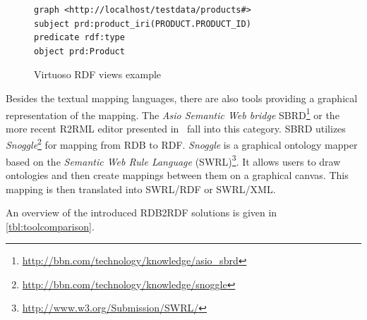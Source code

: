 \begin{figure}[!h]
\centering
\begin{verbatim}
graph <http://localhost/testdata/products#>
subject prd:product_iri(PRODUCT.PRODUCT_ID)
predicate rdf:type
object prd:Product
\end{verbatim}
\caption{Virtuoso RDF views example}
\label{lst:lst4}
\end{figure}


Besides the textual mapping languages, there are also tools providing a graphical representation of the mapping.
The \emph{Asio Semantic Web bridge} SBRD\footnote{\url{http://bbn.com/technology/knowledge/asio_sbrd}} or the more recent R2RML editor presented in~\cite{r2rmleditor} fall into this category.
SBRD utilizes \emph{Snoggle}\footnote{\url{http://bbn.com/technology/knowledge/snoggle}} for mapping from RDB to RDF.
\emph{Snoggle} is a graphical ontology mapper based on the \emph{Semantic Web Rule Language} (SWRL)\footnote{\url{http://www.w3.org/Submission/SWRL/}}.
It allows users to draw ontologies and then create mappings between them on a graphical canvas.
This mapping is then translated into SWRL/RDF or SWRL/XML.

An overview of the introduced RDB2RDF solutions is given in \autoref{tbl:toolcomparison}.




